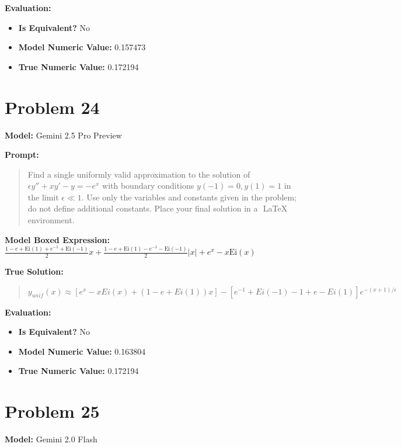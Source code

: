 \documentclass{article}
\begin{document}
\textbf{Evaluation:}
\begin{itemize}
\item \textbf{Is Equivalent?} No
\item \textbf{Model Numeric Value:} 0.157473
\item \textbf{True Numeric Value:} 0.172194
\end{itemize}
\vspace{1cm}
\section*{Problem 24}
\textbf{Model:} Gemini 2.5 Pro Preview

\textbf{Prompt:}
\begin{quote}
Find a single uniformly valid approximation to the solution of $\epsilon y'' + x y' - y = -e^x$ with boundary conditions $y(-1)=0, y(1)=1$ in the limit $\epsilon \ll 1$. Use only the variables and constants given in the problem; do not define additional constants. Place your final solution in a $\boxed{}$ LaTeX environment.
\end{quote}
\textbf{Model Boxed Expression:} $\frac{1-e+\text{Ei}(1)+e^{-1}+\text{Ei}(-1)}{2}x + \frac{1-e+\text{Ei}(1)-e^{-1}-\text{Ei}(-1)}{2}|x| + e^x - x\text{Ei}(x)$

\textbf{True Solution:}
\begin{quote}
$y_{unif}(x) \approx \left[ e^x - x Ei(x) + (1 - e + Ei(1)) x \right] - \left[e^{-1} + Ei(-1) - 1 + e - Ei(1)\right] e^{-(x+1)/\epsilon}$
\end{quote}

\textbf{Evaluation:}
\begin{itemize}
\item \textbf{Is Equivalent?} No
\item \textbf{Model Numeric Value:} 0.163804
\item \textbf{True Numeric Value:} 0.172194
\end{itemize}
\vspace{1cm}
\section*{Problem 25}
\textbf{Model:} Gemini 2.0 Flash
\end{document}
